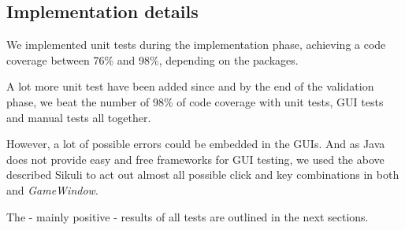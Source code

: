 \subsection{Implementation details}
We implemented unit tests during the implementation phase, achieving a code coverage between 76\% and 98\%, depending on the packages.\par
A lot more unit test have been added since and by the end of the validation phase, we beat the number of 98\%  of code coverage with unit tests, GUI tests and manual tests all together.\par
However, a lot of possible errors could be embedded in the GUIs. And as Java does not provide easy and free frameworks for GUI testing, we used the above described Sikuli to act out almost all possible click and key combinations in both \gameexplorer and \emph{GameWindow}.\par
The - mainly positive - results of all tests are outlined in the next sections.\par
